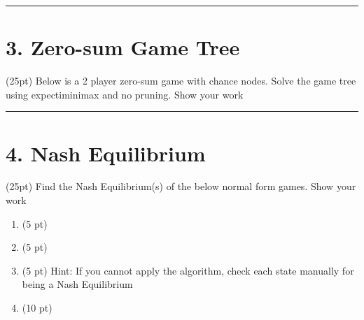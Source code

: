 \documentclass[11pt]{article}
\begin{document}
\begin{flushleft}
\rule{\textwidth}{0.5pt}

\section*{3. Zero-sum Game Tree}
(25pt) Below is a 2 player zero-sum game with chance nodes. Solve the game tree
    using expectiminimax and no pruning. Show your work

\rule{\textwidth}{0.5pt}

\section*{4. Nash Equilibrium}
(25pt) Find the Nash Equilibrium(s) of the below normal form games. Show your
    work

\begin{enumerate}[label=\alph*.]
    \item (5 pt)
    \item (5 pt)
    \item (5 pt) Hint: If you cannot apply the algorithm, check each state
        manually for being a Nash Equilibrium
    \item (10 pt)
\end{enumerate}

\end{flushleft}
\end{document}
